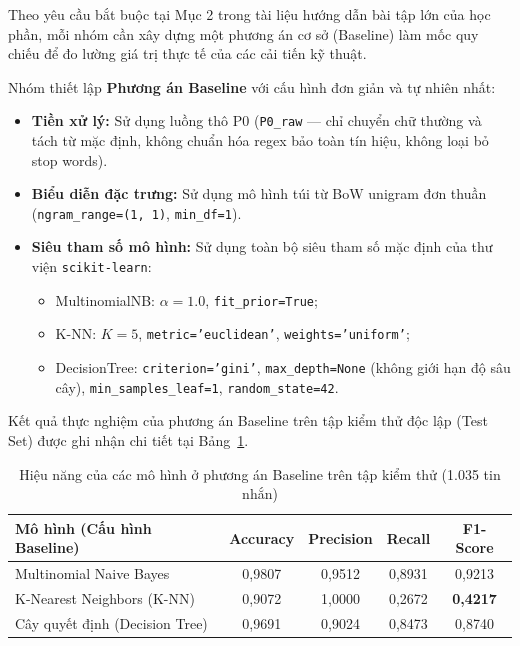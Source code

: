 Theo yêu cầu bắt buộc tại Mục 2 trong tài liệu hướng dẫn bài tập lớn của học phần, mỗi nhóm cần xây dựng một phương án cơ sở (Baseline) làm mốc quy chiếu để đo lường giá trị thực tế của các cải tiến kỹ thuật.

Nhóm thiết lập \textbf{Phương án Baseline} với cấu hình đơn giản và tự nhiên nhất:
\begin{itemize}
    \item \textbf{Tiền xử lý:} Sử dụng luồng thô P0 (\texttt{P0\_raw} --- chỉ chuyển chữ thường và tách từ mặc định, không chuẩn hóa regex bảo toàn tín hiệu, không loại bỏ stop words).
    \item \textbf{Biểu diễn đặc trưng:} Sử dụng mô hình túi từ BoW unigram đơn thuần (\texttt{ngram\_range=(1, 1)}, \texttt{min\_df=1}).
    \item \textbf{Siêu tham số mô hình:} Sử dụng toàn bộ siêu tham số mặc định của thư viện \texttt{scikit-learn}:
    \begin{itemize}
        \item MultinomialNB: $\alpha = 1.0$, \texttt{fit\_prior=True};
        \item K-NN: $K = 5$, \texttt{metric='euclidean'}, \texttt{weights='uniform'};
        \item DecisionTree: \texttt{criterion='gini'}, \texttt{max\_depth=None} (không giới hạn độ sâu cây), \texttt{min\_samples\_leaf=1}, \texttt{random\_state=42}.
    \end{itemize}
\end{itemize}

Kết quả thực nghiệm của phương án Baseline trên tập kiểm thử độc lập (Test Set) được ghi nhận chi tiết tại Bảng~\ref{tab:ket-qua-baseline}.

\begin{table}[H]
\centering
\caption{Hiệu năng của các mô hình ở phương án Baseline trên tập kiểm thử (1.035 tin nhắn)}
\label{tab:ket-qua-baseline}
\begin{tabular}{|l|c|c|c|c|}
\hline
\textbf{Mô hình (Cấu hình Baseline)} & \textbf{Accuracy} & \textbf{Precision} & \textbf{Recall} & \textbf{F1-Score} \\
\hline
Multinomial Naive Bayes & 0,9807 & 0,9512 & 0,8931 & 0,9213 \\
\hline
K-Nearest Neighbors (K-NN) & 0,9072 & 1,0000 & 0,2672 & \textbf{0,4217} \\
\hline
Cây quyết định (Decision Tree) & 0,9691 & 0,9024 & 0,8473 & 0,8740 \\
\hline
\end{tabular}
\end{table}


